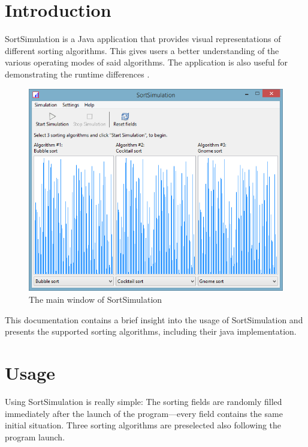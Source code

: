 \documentclass[nobranding]{pfBook}
\begin{document}
	\maketitlepage
	\cleardoublepage
	\maketableofcontents
	\cleardoublepage
	
	\section{Introduction}
	
	SortSimulation is a Java application that provides visual representations of different sorting algorithms. This gives users a better understanding of the various operating modes of said algorithms. The application is also useful for demonstrating the runtime differences .
	
	\begin{figure}[h]
		\centering
		\includegraphics[scale=0.6]{images/image0.png}
		\caption{The main window of SortSimulation}
	\end{figure}
	
	This documentation contains a brief insight into the usage of SortSimulation and presents the supported sorting algorithms, including their java implementation.
	
	\section{Usage}
	
	Using SortSimulation is really simple: The sorting fields are randomly filled immediately after the launch of the program---every field contains the same initial situation. Three sorting algorithms are preselected also following the program launch.
	
\end{document}
